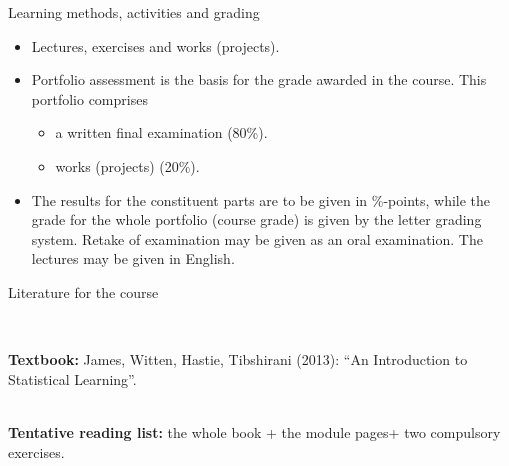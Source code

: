 \documentclass[10pt,ignorenonframetext,]{beamer}
\providecommand{\tightlist}{%
  \setlength{\itemsep}{0pt}\setlength{\parskip}{0pt}}
\begin{document}
\begin{frame}

\begin{block}{Learning methods, activities and grading}

\begin{itemize}
\item
  Lectures, exercises and works (projects). ~
\item
  Portfolio assessment is the basis for the grade awarded in the course.
  This portfolio comprises

  \begin{itemize}
  \tightlist
  \item
    a written final examination (80\%).
  \item
    works (projects) (20\%). ~
  \end{itemize}
\item
  The results for the constituent parts are to be given in \%-points,
  while the grade for the whole portfolio (course grade) is given by the
  letter grading system. Retake of examination may be given as an oral
  examination. The lectures may be given in English.
\end{itemize}

\end{block}

\end{frame}

\begin{frame}

\begin{block}{Literature for the course}

~\\
\hspace*{0.333em}

\textbf{Textbook:} James, Witten, Hastie, Tibshirani (2013): ``An
Introduction to Statistical Learning''.

~\\
\textbf{Tentative reading list:} the whole book + the module pages+ two
compulsory exercises.

\end{block}

\end{frame}
\end{document}
